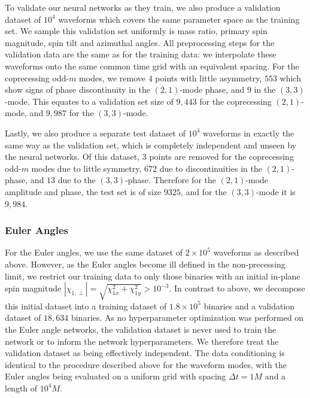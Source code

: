 \documentclass[prd,amssymb,amsmath,amsfonts,superscriptaddress,nofootinbib,reprint,showpacs, longbibliography]{revtex4-1}
\begin{document}
To validate our neural networks as they train, we also produce a validation dataset of $10^4$ waveforms which covers the same parameter space as the training set. We sample this validation set uniformly is mass ratio, primary spin magnitude, spin tilt and azimuthal angles. All preprocessing steps for the validation data are the same as for the training data: we interpolate these waveforms onto the same common time grid with an equivalent spacing. For the coprecessing odd-$m$ modes, we remove $4$ points with little asymmetry, $553$ which show signs of phase discontinuity in the $(2,1)$-mode phase, and $9$ in the $(3,3)$-mode. This equates to a validation set size of $9,443$ for the coprecessing $(2,1)$-mode, and $9,987$ for the $(3,3)$-mode.

Lastly, we also produce a separate test dataset of $10^4$ waveforms in exactly the same way as the validation set, which is completely independent and unseen by the neural networks. Of this dataset, $3$ points are removed for the coprecessing odd-$m$ modes due to little symmetry, $672$ due to discontinuities in the $(2,1)$-phase, and $13$ due to the $(3,3)$-phase. Therefore for the $(2,1)$-mode amplitude and phase, the test set is of size $9325$, and for the $(3,3)$-mode it is $9,984$.

\subsubsection{Euler Angles}
For the Euler angles, we use the same dataset of $2 \times 10^5$ waveforms as described above. However, as the Euler angles become ill defined in the non-precessing limit, we restrict our training data to only those binaries with an initial in-plane spin magnitude $|\chi_{1,\perp}|=\sqrt{\chi_{1x}^2 + \chi_{1y}^2} > 10^{-3}$. In contrast to above, we decompose this initial dataset into a training dataset of $1.8 \times 10^5$ binaries and a validation dataset of $18,634$ binaries. As no hyperparameter optimization was performed on the Euler angle networks, the validation dataset is never used to train the network or to inform the network hyperparameters. We therefore treat the validation dataset as being effectively independent. The data conditioning is identical to the procedure described above for the waveform modes, with the Euler angles being evaluated on a uniform grid with spacing $\Delta t = 1 M$ and a length of $10^4 M$. 

\end{document}

